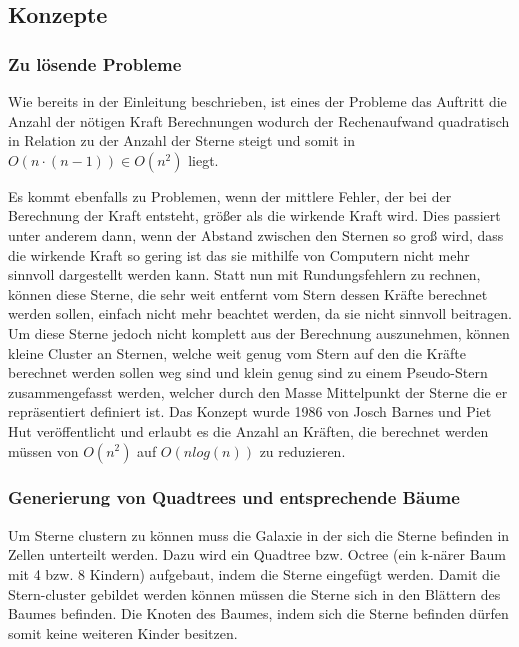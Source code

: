 \subsection{Konzepte}

\subsubsection{Zu lösende Probleme}
Wie bereits in der Einleitung beschrieben, ist eines der Probleme das Auftritt
die Anzahl der nötigen Kraft Berechnungen wodurch der Rechenaufwand quadratisch
in Relation zu der Anzahl der Sterne steigt und somit in \( O(n \cdot (n - 1))
\in O(n^2) \) liegt.

\par Es kommt ebenfalls zu Problemen, wenn der mittlere Fehler, der bei der
Berechnung der Kraft entsteht, größer als die wirkende Kraft wird. Dies
passiert unter anderem dann, wenn der Abstand zwischen den Sternen so groß
wird, dass die wirkende Kraft so gering ist das sie mithilfe von Computern
nicht mehr sinnvoll dargestellt werden kann. Statt nun mit Rundungsfehlern zu
rechnen, können diese Sterne, die sehr weit entfernt vom Stern dessen Kräfte
berechnet werden sollen, einfach nicht mehr beachtet werden, da sie nicht
sinnvoll beitragen. Um diese Sterne jedoch nicht komplett aus der Berechnung
auszunehmen, können kleine Cluster an Sternen, welche weit genug vom Stern auf
den die Kräfte berechnet werden sollen weg sind und klein genug sind zu einem
Pseudo-Stern zusammengefasst werden, welcher durch den Masse Mittelpunkt der
Sterne die er repräsentiert definiert ist. Das Konzept wurde 1986 von Josch
Barnes und Piet Hut veröffentlicht \cite{barneshut86} und erlaubt es die Anzahl
an Kräften, die berechnet werden müssen von \( O(n^2) \) auf \( O(n log(n)) \)
zu reduzieren.

\subsubsection{Generierung von Quadtrees und entsprechende Bäume}
Um Sterne clustern zu können muss die Galaxie in der sich die Sterne befinden
in Zellen unterteilt werden. Dazu wird ein Quadtree bzw. Octree (ein k-närer
Baum mit 4 bzw. 8 Kindern) aufgebaut, indem die Sterne eingefügt werden. Damit
die Stern-cluster gebildet werden können müssen die Sterne sich in den Blättern
des Baumes befinden. Die Knoten des Baumes, indem sich die Sterne befinden
dürfen somit keine weiteren Kinder besitzen.


